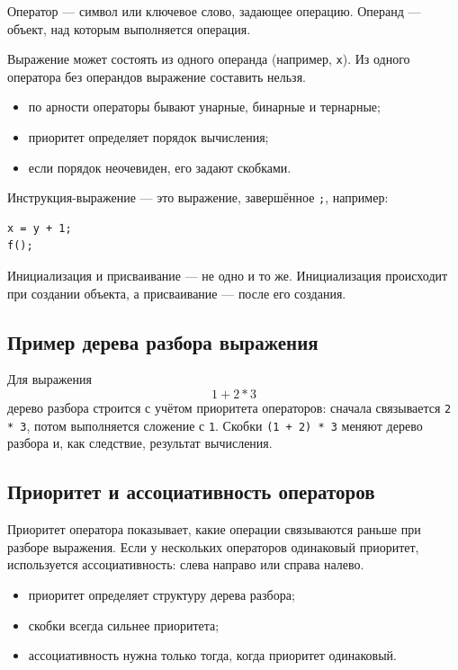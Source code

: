 \begin{definition}
Оператор — символ или ключевое слово, задающее операцию. Операнд — объект, над которым выполняется операция.
\end{definition}

Выражение может состоять из одного операнда (например, \texttt{x}). Из одного оператора без операндов выражение составить нельзя.

\begin{itemize}
    \item по арности операторы бывают унарные, бинарные и тернарные;
    \item приоритет определяет порядок вычисления;
    \item если порядок неочевиден, его задают скобками.
\end{itemize}

\begin{definition}
Инструкция-выражение — это выражение, завершённое \texttt{;}, например:
\begin{verbatim}
x = y + 1;
f();
\end{verbatim}
\end{definition}

\begin{remark}
Инициализация и присваивание — не одно и то же. Инициализация происходит при создании объекта, а присваивание — после его создания.
\end{remark}

\subsection{Пример дерева разбора выражения}
Для выражения
\[
1 + 2 * 3
\]
дерево разбора строится с учётом приоритета операторов: сначала связывается \texttt{2 * 3}, потом выполняется сложение с \texttt{1}. Скобки \texttt{(1 + 2) * 3} меняют дерево разбора и, как следствие, результат вычисления.

\subsection{Приоритет и ассоциативность операторов}
Приоритет оператора показывает, какие операции связываются раньше при разборе выражения. Если у нескольких операторов одинаковый приоритет, используется ассоциативность: слева направо или справа налево.

\begin{itemize}
    \item приоритет определяет структуру дерева разбора;
    \item скобки всегда сильнее приоритета;
    \item ассоциативность нужна только тогда, когда приоритет одинаковый.
\end{itemize}

